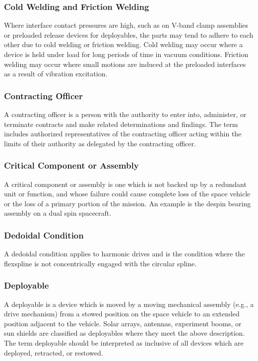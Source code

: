 \documentclass[12pt]{article}
\begin{document}
\subsubsection{Cold Welding and Friction Welding}
Where interface contact pressures are high, such as on V-band clamp assemblies or preloaded release devices for deployables, the parts may tend to adhere to each other due to cold welding or friction welding. 
Cold welding may occur where a device is held under load for long periods of time in vacuum conditions. 
Friction welding may occur where small motions are induced at the preloaded interfaces as a result of vibration excitation.

\subsubsection{Contracting Officer}
A contracting officer is a person with the authority to enter into, administer, or terminate contracts and make related determinations and findings. 
The term includes authorized representatives of the contracting officer acting within the limits of their authority as delegated by the contracting officer.

\subsubsection{Critical Component or Assembly}
A critical component or assembly is one which is not backed up by a redundant unit or function, and whose failure could cause complete loss of the space vehicle or the loss of a primary portion of the mission. 
An example is the despin bearing assembly on a dual spin spacecraft.

\subsubsection{Dedoidal Condition}
A dedoidal condition applies to harmonic drives and is the condition where the flexspline is not concentrically engaged with the circular spline.

\subsubsection{Deployable}
A deployable is a device which is moved by a moving mechanical assembly (e.g., a drive mechanism) from a stowed position on the space vehicle to an extended position adjacent to the vehicle. 
Solar arrays, antennas, experiment booms, or sun shields are classified as deployables where they meet the above description. 
The term deployable should be interpreted as inclusive of all devices which are deployed, retracted, or restowed.
\end{document}
